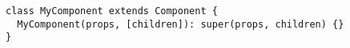       \begin{verbatim}
class MyComponent extends Component {
  MyComponent(props, [children]): super(props, children) {}
}
      \end{verbatim}
